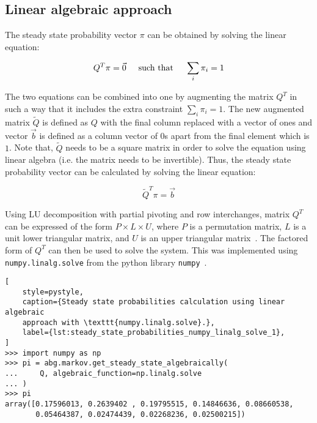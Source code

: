 \subsection{Linear algebraic approach}

The steady state probability vector \( \pi \) can be obtained by solving the
linear equation:

\begin{equation}\label{eq:numpy_linalg_solve_1}
    Q^T \pi = \vec{0} \hspace{0.5cm} \text{such that} \hspace{0.5cm}
    \sum_{i} \pi_i = 1
\end{equation}

The two equations can be combined into one by augmenting the matrix \( Q^T \)
in such a way that it includes the extra constraint \( \sum_i \pi_i = 1 \).
The new augmented matrix \(\tilde Q\) is defined as \(Q\) with the final
column replaced with a vector of ones and vector \(\vec{b}\) is defined
as a column vector of \(0\)s apart from the final element which is \(1\).
Note that, \(\tilde Q\) needs to be a square matrix in order to solve the
equation using linear algebra (i.e. the matrix needs to be invertible).
Thus, the steady state probability vector can be calculated by solving the
linear equation:

\begin{equation}
    \tilde Q^T \pi = \vec{b}
\end{equation}

Using LU decomposition with partial pivoting and row interchanges, matrix
\(Q^T\) can be expressed of the form \(P \times L \times U\), where \(P\) is
a permutation matrix, \(L\) is a unit lower triangular matrix, and \(U\) is
an upper triangular matrix~\cite{strang2006linear}.
The factored form of \(Q^T\) can then be used to solve the system.
This was implemented using \texttt{numpy.linalg.solve} from the
python library \texttt{numpy}~\cite{2020NumPy-Array, lapack99}.


\begin{lstlisting}[
    style=pystyle,
    caption={Steady state probabilities calculation using linear algebraic
    approach with \texttt{numpy.linalg.solve}.},
    label={lst:steady_state_probabilities_numpy_linalg_solve_1},
]
>>> import numpy as np
>>> pi = abg.markov.get_steady_state_algebraically(
...     Q, algebraic_function=np.linalg.solve
... )
>>> pi
array([0.17596013, 0.2639402 , 0.19795515, 0.14846636, 0.08660538,
       0.05464387, 0.02474439, 0.02268236, 0.02500215])

\end{lstlisting}



